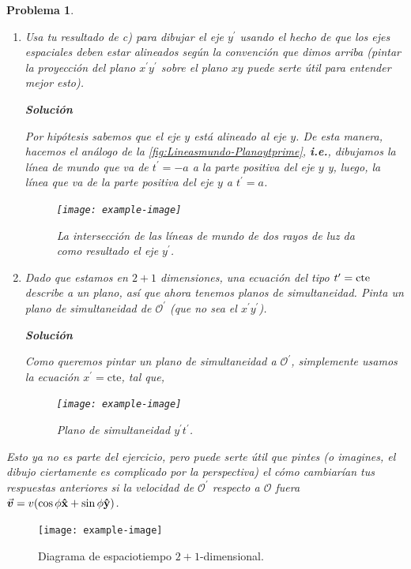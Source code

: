 \documentclass[12pt]{article}
\theoremstyle{break}
\newtheorem{exercise}{Problema}
\theoremstyle{nonumberbreak}
\DeclareRobustCommand{\uvec}[1]{{%
  \ifcsname uvec#1\endcsname
     \csname uvec#1\endcsname
   \else
    \bm{\hat{\mathbf{#1}}}%
   \fi
}}%
\newcommand*{\observer}{\mathcal{O}}
\newcommand*{\primeobserver}{\mathcal{O}^{\prime}}
\newcommand*{\inlinesol}{\vspace*{10pt}\textbf{Solución}\vspace*{10pt}}
\begin{document}
\begin{exercise}
\begin{enumerate}[label = \alph*)]
            Las líneas de mundo en la \cref{fig:Lineasmundo-Planoytprime} se intersectan, ya que, como vimos previamente en clase, las líneas de mundo de rayos de luz se van a intersectar al eje \(y\) en \(y = -a\).

            \item Usa tu resultado de c) para dibujar el eje \(y^{\prime}\) usando el hecho de que los ejes espaciales deben estar alineados según la convención que dimos arriba (pintar la proyección del plano \(x^{\prime}y^{\prime}\) sobre el plano \(xy\) puede serte útil para entender mejor esto).
            
            \inlinesol

            Por hipótesis sabemos que el eje \(y\) está alineado al eje \(y\). De esta manera, hacemos el análogo de la \cref{fig:Lineasmundo-Planoytprime}, \textbf{i.e.}, dibujamos la línea de mundo que va de \(t^{\prime} = -a\) a la parte positiva del eje \(y\) y, luego, la línea que va de la parte positiva del eje \(y\) a \(t^{\prime} = a\).

            \begin{figure}[htb]
                \centering
                \texttt{[image: example-image]}
                \caption{La intersección de las líneas de mundo de dos rayos de luz da como resultado el eje \(y^{\prime}\).}
                \label{fig:Yprimeaxis}
            \end{figure}

            \item Dado que estamos en \(2 + 1\) dimensiones, una ecuación del tipo \(t^{\prime} = \textnormal{cte}\) describe a un plano, así que ahora tenemos planos de simultaneidad. Pinta un plano de simultaneidad de \(\primeobserver\) (que no sea el \(x^{\prime}y^{\prime}\)).
            
            \inlinesol

            Como queremos pintar un plano de simultaneidad a \(\primeobserver\), simplemente usamos la ecuación \(x^{\prime} = \text{cte}\), tal que,

            \begin{figure}[htb]
                \centering
                \texttt{[image: example-image]}
                \caption{Plano de simultaneidad \(y^{\prime}t^{\prime}\).}
                \label{fig:simultainetyPlaneyprimetprime}
            \end{figure}
        \end{enumerate}
        Esto ya no es parte del ejercicio, pero puede serte útil que pintes (o imagines, el dibujo ciertamente es complicado por la perspectiva) el cómo cambiarían tus respuestas anteriores si la velocidad de \(\primeobserver\) respecto a \(\observer\) fuera \(\va*{v} = v(\cos\phi\uvec{x} + \sin\phi\uvec{y})\).
    \end{exercise}

    \begin{figure}[htb]
        \centering
        \texttt{[image: example-image]}
        \caption{Diagrama de espaciotiempo \(2+1\)-dimensional.}
        \label{fig:3D-EspacioTiempo}
    \end{figure}
\end{document}
